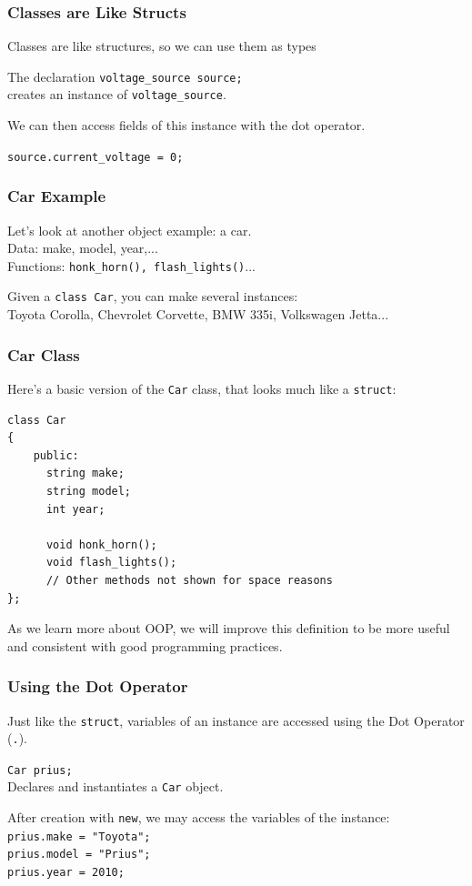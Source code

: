 \begin{frame}
\frametitle{Classes are Like Structs}
Classes are like structures, so we can use them as types

The declaration
\quad \texttt{voltage\_source source;}\\

  
creates an instance of \texttt{voltage\_source}.

We can then access fields of this instance with the dot operator.

\texttt{source.current\_voltage = 0;}

\end{frame}

\begin{frame}
\frametitle{Car Example}

Let's look at another object example: a car.\\
\quad Data: make, model, year,...\\
\quad Functions: \texttt{honk\_horn(), flash\_lights()}...


Given a \texttt{class Car}, you can make several instances:\\
\quad Toyota Corolla, Chevrolet Corvette, BMW 335i, Volkswagen Jetta...

\end{frame}


\begin{frame}[fragile]
\frametitle{Car Class}

Here's a basic version of the \texttt{Car} class, that looks much like a \texttt{struct}:

{\scriptsize
\begin{verbatim}
class Car
{
    public:
      string make;
      string model;
      int year;
    
      void honk_horn();
      void flash_lights();
      // Other methods not shown for space reasons
};
\end{verbatim}
}

As we learn more about OOP, we will improve this definition to be more useful and consistent with good programming practices.

\end{frame}

\begin{frame}
\frametitle{Using the Dot Operator}

Just like the \texttt{struct}, variables of an instance are accessed using the Dot Operator (\texttt{.}).

\texttt{Car prius;}\\
\quad Declares and instantiates a \texttt{Car} object.

After creation with \texttt{new}, we may access the variables of the instance:\\
\quad \texttt{prius.make  = "Toyota";}\\
\quad \texttt{prius.model = "Prius";}\\
\quad \texttt{prius.year  = 2010;}

\end{frame}



